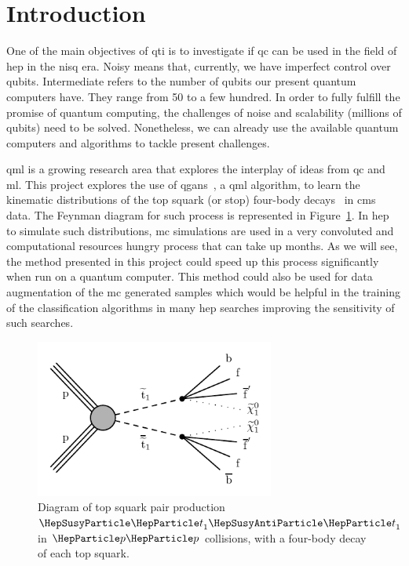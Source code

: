 \section{Introduction}
\label{sec:intro}

One of the main objectives of \gls{qti} is to investigate if \gls{qc} can be 
used in the field of \gls{hep} in the \gls{nisq} era. Noisy means that, currently,
we have imperfect control over qubits. Intermediate refers to the number of qubits
our present quantum computers have. They range from 50 to a few hundred. 
In order to fully fulfill the promise of quantum computing, the challenges of
noise and scalability (millions of qubits) need to be solved. Nonetheless, we
can already use the available quantum computers and algorithms to tackle present
challenges. 

\gls{qml} is a growing research area that explores the interplay of ideas from \gls{qc} 
and \gls{ml}. This project explores the use of \glspl{qgan}~\cite{Zoufal_2019}, 
a \gls{qml} algorithm, to learn the kinematic distributions of the top squark (or stop) four-body 
decays~\cite{ph-brief-stop} in \gls{cms} data. The Feynman diagram for such process 
is represented in Figure~\ref{fig:model}. In \gls{hep} to simulate such 
distributions, \gls{mc} simulations are used in a very convoluted and computational
resources hungry process that can take up months. As we will see, the method 
presented in this project could speed up this process significantly when run on 
a quantum computer. This method could also be used for data augmentation of the 
\gls{mc} generated samples which would be helpful in the training of the 
classification algorithms in many \gls{hep} searches improving the sensitivity of
such searches.

\clearpage

\begin{figure}[!htbp]
\centering
	\includegraphics[width=0.70\textwidth]{figures/Figure_001.pdf}
\caption{Diagram of top squark pair production $\stp \stpb$ in $\Pp\Pp$ collisions, 
with a four-body decay of each top squark.}
\label{fig:model}
\end{figure}

